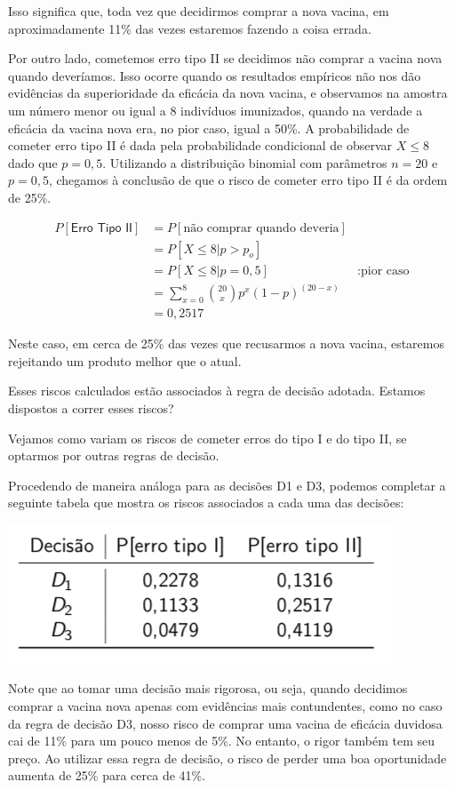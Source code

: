 \documentclass[
]{book}
\theoremstyle{definition}
\theoremstyle{definition}
\theoremstyle{definition}
\theoremstyle{remark}
\begin{document}
Isso significa que, toda vez que decidirmos comprar a nova vacina, em aproximadamente 11\% das vezes estaremos fazendo a coisa errada.

Por outro lado, cometemos erro tipo II se decidimos não comprar a vacina nova quando deveríamos. Isso ocorre quando os resultados empíricos não nos dão evidências da superioridade da eficácia da nova vacina, e observamos na amostra um número menor ou igual a 8 indivíduos imunizados, quando na verdade a eficácia da vacina nova era, no pior caso, igual a 50\%. A probabilidade de cometer erro tipo II é dada pela probabilidade condicional de observar \(X \leq 8\) dado que \(p = 0,5\). Utilizando a distribuição binomial com parâmetros \(n=20\) e \(p=0,5\), chegamos à conclusão de que o risco de cometer erro tipo II é da ordem de 25\%.

\begin{align*}
  P[\textsf{Erro Tipo II}] 
    &= P [\text{não comprar quando deveria}] \\
    &= P [X \leq 8 | p > p_o]\\
    &= P [X \leq 8 | p  = 0,5] &: \text{pior caso}\\
    &= \sum_{x=0}^{8} \binom{20}{x} p^x (1-p)^{(20-x)}\\
    &= 0,2517
\end{align*}

Neste caso, em cerca de 25\% das vezes que recusarmos a nova vacina, estaremos rejeitando um produto melhor que o atual.

Esses riscos calculados estão associados à regra de decisão adotada.
Estamos dispostos a correr esses riscos?

Vejamos como variam os riscos de cometer erros do tipo I e do tipo II, se optarmos por outras regras de decisão.

Procedendo de maneira análoga para as decisões D1 e D3, podemos completar a seguinte tabela que mostra os riscos associados a cada uma das decisões:

\includegraphics[width=0.6\linewidth]{img/vaccine-decisoes}

Note que ao tomar uma decisão mais rigorosa, ou seja, quando decidimos comprar a vacina nova apenas com evidências mais contundentes, como no caso da regra de decisão D3, nosso risco de comprar uma vacina de eficácia duvidosa cai de 11\% para um pouco menos de 5\%. No entanto, o rigor também tem seu preço. Ao utilizar essa regra de decisão, o risco de perder uma boa oportunidade aumenta de 25\% para cerca de 41\%.
\end{document}
